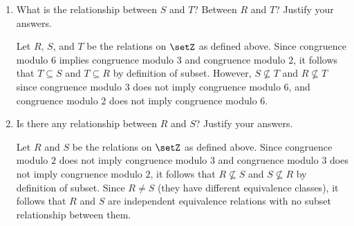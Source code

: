 \begin{enumerate}
\begin{enumerate}
      \begin{subanswer}
        Let $T$ and $R$ be the relations on $\setZ$ as defined above. 
        The partition resulting from $T$ is a refinement of the partition resulting from $R$. 
        This is because for each equivalence class $[k]_T$ of $T$ where $0 \leq k < 6$, 
        since $a \in [k]_T$ if and only if $a \equiv k \pmod{6}$ by definition of , 
        and since $a \equiv k \pmod{6}$ implies $a \equiv k \pmod{2}$, 
        it follows that $a \in [k \bmod 2]_R$ by definition of . 
        Therefore, $[k]_T \subseteq [k \bmod 2]_R$ by definition of subset, 
        and the partition resulting from $T$ is a refinement of the partition resulting from $R$ by definition of .
      \end{subanswer}
    \item What is the relationship between $S$ and $T$? Between $R$ and $T$? Justify your answers.
      \begin{subanswer}
        Let $R$, $S$, and $T$ be the relations on $\setZ$ as defined above. 
        Since congruence modulo $6$ implies congruence modulo $3$ and congruence modulo $2$, 
        it follows that $T \subseteq S$ and $T \subseteq R$ by definition of subset. 
        However, $S \not\subseteq T$ and $R \not\subseteq T$ since congruence modulo $3$ does not imply congruence modulo $6$, 
        and congruence modulo $2$ does not imply congruence modulo $6$.
      \end{subanswer}
    \item Is there any relationship between $R$ and $S$? Justify your answers.
      \begin{subanswer}
        Let $R$ and $S$ be the relations on $\setZ$ as defined above. 
        Since congruence modulo $2$ does not imply congruence modulo $3$ and congruence modulo $3$ does not imply congruence modulo $2$, 
        it follows that $R \not\subseteq S$ and $S \not\subseteq R$ by definition of subset. 
        Since $R \neq S$ (they have different equivalence classes), 
        it follows that $R$ and $S$ are independent equivalence relations with no subset relationship between them.
      \end{subanswer}
  \end{enumerate}
\end{enumerate}